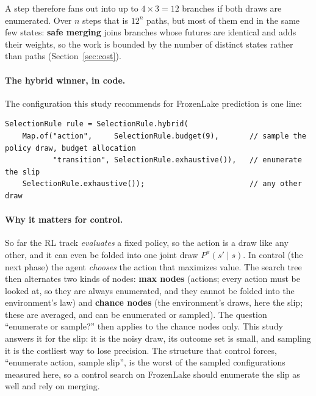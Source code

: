 \documentclass[11pt]{article}
\begin{document}
\begin{center}
\end{center}

A step therefore fans out into up to $4\times 3=12$ branches if both draws are enumerated. Over $n$ steps that is
$12^n$ paths, but most of them end in the same few states: \textbf{safe merging} joins branches whose futures are
identical and adds their weights, so the work is bounded by the number of distinct states rather than paths
(Section~\ref{sec:cost}).

\paragraph{The hybrid winner, in code.} The configuration this study recommends for FrozenLake prediction is one line:
\begin{lstlisting}
SelectionRule rule = SelectionRule.hybrid(
    Map.of("action",     SelectionRule.budget(9),       // sample the policy draw, budget allocation
           "transition", SelectionRule.exhaustive()),   // enumerate the slip
    SelectionRule.exhaustive());                        // any other draw
\end{lstlisting}

\paragraph{Why it matters for control.} So far the RL track \emph{evaluates} a fixed policy, so the action is a draw
like any other, and it can even be folded into one joint draw $P^\pi(s'\mid s)$. In control (the next phase) the agent
\emph{chooses} the action that maximizes value. The search tree then alternates two kinds of nodes: \textbf{max nodes}
(actions; every action must be looked at, so they are always enumerated, and they cannot be folded into the
environment's law) and \textbf{chance nodes} (the environment's draws, here the slip; these are averaged, and can be
enumerated or sampled). The question ``enumerate or sample?'' then applies to the chance nodes only. This study answers
it for the slip: it is the noisy draw, its outcome set is small, and sampling it is the costliest way to lose precision.
The structure that control forces, ``enumerate action, sample slip'', is the worst of the sampled configurations
measured here, so a control search on FrozenLake should enumerate the slip as well and rely on merging.
\end{document}
